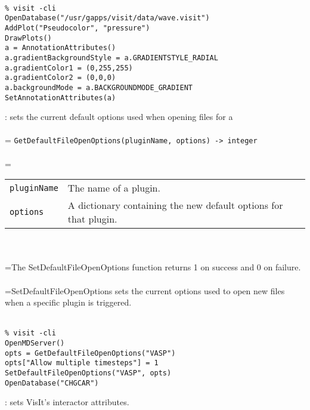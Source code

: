 \documentclass[10pt,a4paper]{report}
\begin{document}
\\[-6mm]
\begin{verbatim}% visit -cli
OpenDatabase("/usr/gapps/visit/data/wave.visit")
AddPlot("Pseudocolor", "pressure")
DrawPlots()
a = AnnotationAttributes()
a.gradientBackgroundStyle = a.GRADIENTSTYLE_RADIAL
a.gradientColor1 = (0,255,255)
a.gradientColor2 = (0,0,0)
a.backgroundMode = a.BACKGROUNDMODE_GRADIENT
SetAnnotationAttributes(a)
\end{verbatim}
\newpage


{}
: sets the current default options used when opening files for a\\[-3mm]

 \\ 
\hangindent=\parindent 
\verb!GetDefaultFileOpenOptions(pluginName, options) -> integer!\\ [-3mm]

 \\ 
\hangindent=\parindent 
\begin{tabular}{lp{9cm}}
\verb!pluginName! & The name of a plugin. \\
\verb!options! & A dictionary containing the new default options for that plugin. \\
\end{tabular} \\[-2mm]


 \\ 
\hangindent=\parindent The SetDefaultFileOpenOptions function returns 1 on success and 0 on failure. \\[-3mm] 

 \\ 
\hangindent=\parindent SetDefaultFileOpenOptions sets the current options used to open new files when a specific plugin is triggered. \\[-3mm] 

\\[-6mm]
\begin{verbatim}% visit -cli
OpenMDServer()
opts = GetDefaultFileOpenOptions("VASP")
opts["Allow multiple timesteps"] = 1
SetDefaultFileOpenOptions("VASP", opts)
OpenDatabase("CHGCAR")
\end{verbatim}
\newpage


{}
: sets VisIt's interactor attributes.\\[-3mm]
\end{document}
